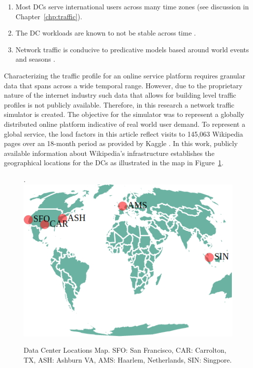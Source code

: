 \begin{enumerate}
\item Most DCs serve international users across many time zones (see discussion in Chapter~\ref{chp:traffic}). 
\item The DC workloads are known to not be stable across time \cite{harchol13}. 
\item Network traffic is conducive to predicative models based around world events and seasons \cite{zhuang15}.
\end{enumerate}

 Characterizing the traffic profile for an online service platform requires granular data that spans across a wide temporal range. However, due to the proprietary nature of the internet industry such data that allows for building level traffic profiles is not publicly available. Therefore, in this research a network traffic simulator is created. The objective for the simulator was to represent a globally distributed online platform indicative of real world user demand. To represent a global service, the load factors in this article reflect visits to 145,063 Wikipedia pages over an 18-month period as provided by Kaggle \citep{kaggle17}. In this work, publicly available information about Wikipedia's infrastructure establishes the geographical locations for the DCs as illustrated in the map in Figure~\ref{fig:dc_map}.

\begin{figure}[!h].
\centering
\includegraphics[scale=0.45]{building_energy_model/img/dc_locations.png}
\caption[DC Locations]{Data Center Locations Map. SFO: San Francisco, CAR: Carrolton, TX, ASH: Ashburn VA, AMS: Haarlem, Netherlands, SIN: Singpore.}
\label{fig:dc_map}
\end{figure}

